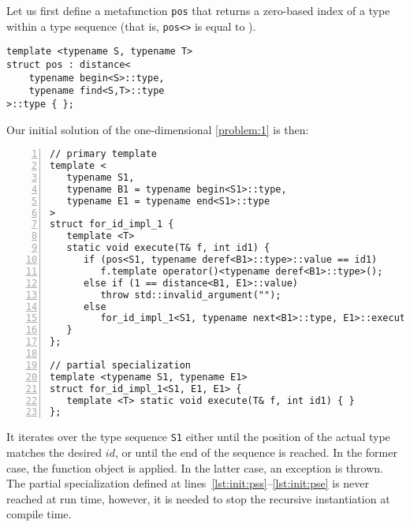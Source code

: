 \documentclass[10pt,a4paper]{article}
\theoremstyle{definition}\newtheorem{problem}{Problem}
\providecommand{\symidb}{\ensuremath{\mathit{id}}}
\providecommand{\symidbx}{\symidb\xspace}
\providecommand{\pos}{\texttt{pos}\xspace}
\begin{document}
Let us first define a metafunction \pos that returns a zero-based index of a type within a type sequence (that is, \pos\texttt{<}\texttt{>} is equal to ). \\
\begin{lstlisting}
template <typename S, typename T>
struct pos : distance<
    typename begin<S>::type,
    typename find<S,T>::type
>::type { };
\end{lstlisting}
Our initial solution of the one-dimensional \autoref{problem:1} is then:
{\small
\begin{lstlisting}[numbers=left,xleftmargin=2em]
// primary template
template <                                                                        (* \label{lst:init:pts} *)
   typename S1,
   typename B1 = typename begin<S1>::type,                                        (* \label{lst:init:b} *)
   typename E1 = typename end<S1>::type                                           (* \label{lst:init:e} *) 
>
struct for_id_impl_1 { 
   template <T>                                                                   (* \label{lst:init:exs} *)
   static void execute(T& f, int id1) {
      if (pos<S1, typename deref<B1>::type>::value == id1)                        (* \label{lst:init:condo} *)
         f.template operator()<typename deref<B1>::type>();                       (* \label{lst:init:appl} *)
      else if (1 == distance<B1, E1>::value)                                      (* \label{lst:init:condt} *)
         throw std::invalid_argument("");
      else
         for_id_impl_1<S1, typename next<B1>::type, E1>::execute(f, id1);         (* \label{lst:init:rec} *)
   }                                                                              (* \label{lst:init:exe} *)
};                                                                                (* \label{lst:init:ets} *)

// partial specialization
template <typename S1, typename E1>                                               (* \label{lst:init:pss} *)
struct for_id_impl_1<S1, E1, E1> { 
   template <T> static void execute(T& f, int id1) { }
};                                                                                (* \label{lst:init:pse} *)
\end{lstlisting}
}
\noindent
It iterates over the type sequence \texttt{S1} either until the position of the actual type matches the desired \symidbx, or until the end of the sequence is reached. In the former case, the function object is applied. In the latter case, an exception is thrown. The partial specialization defined at lines~\ref{lst:init:pss}--\ref{lst:init:pse} is never reached at run time, however, it is needed to stop the recursive instantiation at compile time. 
\end{document}
